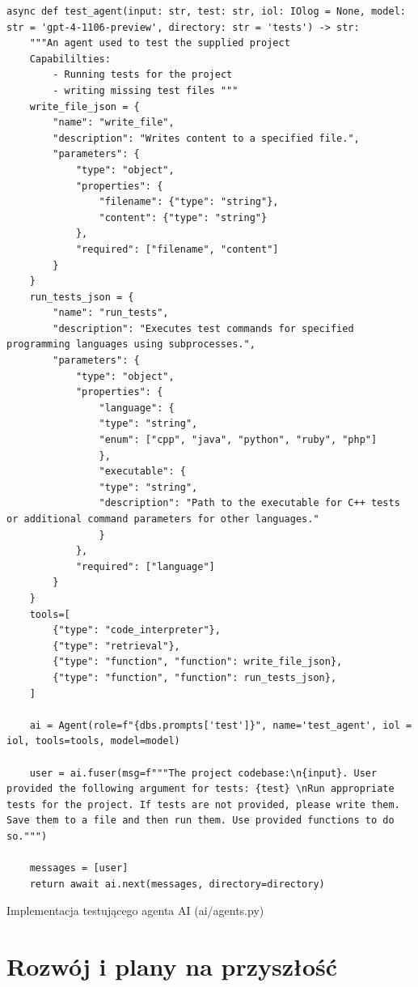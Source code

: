 \begin{listing}
    \begin{verbatim}
async def test_agent(input: str, test: str, iol: IOlog = None, model: str = 'gpt-4-1106-preview', directory: str = 'tests') -> str:
    """An agent used to test the supplied project
    Capabililties: 
        - Running tests for the project
        - writing missing test files """
    write_file_json = {
        "name": "write_file",
        "description": "Writes content to a specified file.",
        "parameters": {
            "type": "object",
            "properties": {
                "filename": {"type": "string"},
                "content": {"type": "string"}
            },
            "required": ["filename", "content"]
        }
    }
    run_tests_json = {
        "name": "run_tests",
        "description": "Executes test commands for specified programming languages using subprocesses.",
        "parameters": {
            "type": "object",
            "properties": {
                "language": {
                "type": "string",
                "enum": ["cpp", "java", "python", "ruby", "php"]
                },
                "executable": {
                "type": "string",
                "description": "Path to the executable for C++ tests or additional command parameters for other languages."
                }
            },
            "required": ["language"]
        }
    }
    tools=[
        {"type": "code_interpreter"},
        {"type": "retrieval"},
        {"type": "function", "function": write_file_json},
        {"type": "function", "function": run_tests_json},
    ]

    ai = Agent(role=f"{dbs.prompts['test']}", name='test_agent', iol = iol, tools=tools, model=model)
    
    user = ai.fuser(msg=f"""The project codebase:\n{input}. User provided the following argument for tests: {test} \nRun appropriate tests for the project. If tests are not provided, please write them. Save them to a file and then run them. Use provided functions to do so.""")
    
    messages = [user]
    return await ai.next(messages, directory=directory)
\end{verbatim}
\caption{Implementacja testującego agenta AI (ai/agents.py)}
\label{listing:przyklad_agent_ai}
\end{listing}

\section{Rozwój i plany na przyszłość}
\label{sec:rozwoj_i_plany_na_przyszlosc}

